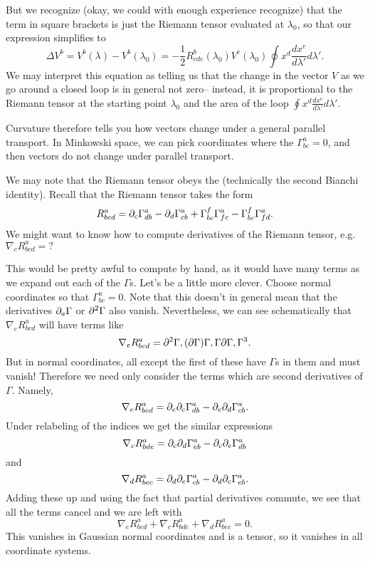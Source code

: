 But we recognize (okay, we could with enough experience recognize) that the term in square brackets is just the Riemann tensor evaluated at $\lambda_0$, so that our expression simplifies to
$$\Delta V^b = V^b(\lambda)-V^b(\lambda_0)=-\frac{1}{2}R^b_{cde}(\lambda_0)V^c(\lambda_0)\oint x^d \frac{dx^e}{d\lambda'}d\lambda'.$$
We may interpret this equation as telling us that the change in the vector $V$ as we go around a closed loop is in general not zero-- instead, it is proportional to the Riemann tensor at the starting point $\lambda_0$ and the area of the loop $\oint x^d \frac{dx^e}{d\lambda'}d\lambda'.$

Curvature therefore tells you how vectors change under a general parallel transport. In Minkowski space, we can pick coordinates where the $\Gamma^a_{bc}=0$, and then vectors do not change under parallel transport.

We may note that the Riemann tensor obeys the  (technically the second Bianchi identity). Recall that the Riemann tensor takes the form
$$R^a_{bcd}=\partial_c \Gamma^a_{db}-\partial_d \Gamma^a_{cb}+\Gamma^f_{bc} \Gamma^a_{fc}-\Gamma^f_{bc}\Gamma^a_{fd}.$$
We might want to know how to compute derivatives of the Riemann tensor, e.g. $\nabla_c R^a_{bcd}=?$

This would be pretty awful to compute by hand, as it would have many terms as we expand out each of the $\Gamma$s. Let's be a little more clever. Choose normal coordinates so that $\Gamma^a_{bc}=0$. Note that this doesn't in general mean that the derivatives $\partial_a \Gamma$ or $\partial^2 \Gamma$ also vanish. Nevertheless, we can see schematically that $\nabla_e R^a_{bcd}$ will have terms like
$$\nabla_e R^a_{bcd}=\partial^2\Gamma,(\partial \Gamma)\Gamma, \Gamma \partial \Gamma, \Gamma^3.$$
But in normal coordinates, all except the first of these have $\Gamma$s in them and must vanish! Therefore we need only consider the terms which are second derivatives of $\Gamma.$ Namely,
$$\nabla_e R^a_{bcd}=\partial_e \partial_c \Gamma^a_{db}-\partial_e \partial_d \Gamma^a_{cb}.$$
Under relabeling of the indices we get the similar expressions
$$\nabla_c R^a_{bde}=\partial_c \partial_d \Gamma^a_{eb}-\partial_c \partial_e \Gamma^a_{db}$$
and
$$\nabla_d R^a_{bec}=\partial_d \partial_e \Gamma^a_{cb}-\partial_d \partial_c \Gamma^a_{eb}.$$
Adding these up and using the fact that partial derivatives commute, we see that all the terms cancel and we are left with
$$\nabla_e R^a_{bcd}+\nabla_c R^a_{bde}+\nabla_d R^a_{bec}=0.$$
This vanishes in Gaussian normal coordinates and is a tensor, so it vanishes in all coordinate systems.

